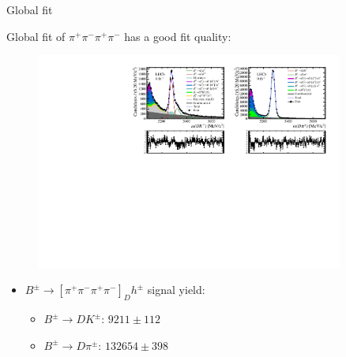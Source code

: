\documentclass[xcolor={dvipsnames}]{beamer}
\begin{document}
\begin{frame}{Global fit}
  \begin{center}
    {\large Global fit of $\pi^+\pi^-\pi^+\pi^-$ has a good fit quality:}
  \end{center}
  \vspace{-0.5cm}
  \begin{figure}
    \centering
    \includegraphics[width = 0.9\textwidth,trim={0 0 0 0},clip=true]{Plots/d2pipipipi_fiveL_allDP.pdf}
  \end{figure}
  \vspace{-0.5cm}
  \begin{itemize}
    \item{$B^\pm\to[\pi^+\pi^-\pi^+\pi^-]_Dh^\pm$ signal yield:}
    \begin{itemize}
      \item{$B^\pm\to DK^\pm$: $9211 \pm 112$}
      \item{$B^\pm\to D\pi^\pm$: $132654 \pm 398$}
    \end{itemize}
  \end{itemize}
\end{frame}
\end{document}
